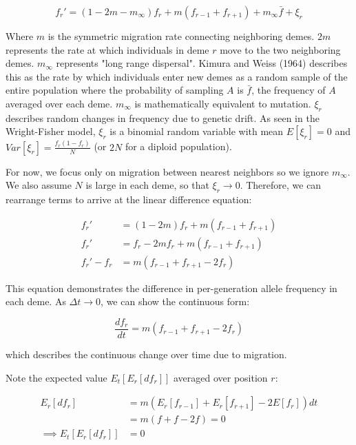 \begin{equation}
    f_r' = (1-2m-m_\infty)f_r + m(f_{r-1} + f_{r+1}) + m_\infty \bar{f} + \xi_r
\end{equation}


Where $m$ is the symmetric migration rate connecting neighboring demes. $2m$ represents the rate at which individuals in deme $r$ move to the two neighboring demes. $m_\infty$ represents "long range dispersal". Kimura and Weiss (1964) \cite{kimura_stepping_1964} describes this as the rate by which individuals enter new demes as a random sample of the entire population where the probability of sampling $A$ is $\bar{f}$, the frequency of $A$ averaged over each deme. $m_\infty$ is mathematically equivalent to mutation. $\xi_r$ describes random changes in frequency due to genetic drift. As seen in the Wright-Fisher model, $\xi_r$ is a binomial random variable with mean $E[\xi_r]=0$ and $Var[\xi_r] = \frac{f_r(1-f_r)}{N}$ (or $2N$ for a diploid population).


For now, we focus only on migration between nearest neighbors so we ignore $m_\infty$. We also assume $N$ is large in each deme, so that $\xi_r \to 0$. Therefore, we can rearrange terms to arrive at the linear difference equation:

\begin{equation}
    \begin{split}
        f_r' &= (1-2m)f_r + m(f_{r-1} + f_{r+1}) \\ 
        f_r' &= f_r -2mf_r + m(f_{r-1} + f_{r+1}) \\
        f_r' - f_r &= m(f_{r-1} + f_{r+1} - 2f_r)
    \end{split}
\end{equation}


This equation demonstrates the difference in per-generation allele frequency in each deme. As $\Delta t \to 0$, we can show the continuous form:

\begin{equation}
    \frac{df_r}{dt} = m(f_{r-1} + f_{r+1} -2f_r)
\end{equation}

which describes the continuous change over time due to migration. 


Note the expected value $E_t[E_r[df_r]]$ averaged over position $r$:

\begin{equation} \label{eq:exp_ss}
    \begin{split}
        E_r[df_r] &= m(E_r[f_{r-1}] + E_r[f_{r+1}] -2E[f_r])dt \\
        &= m(f+f-2f) = 0 \\
        \implies E_t[E_r[df_r]] &= 0 
    \end{split}
\end{equation}


